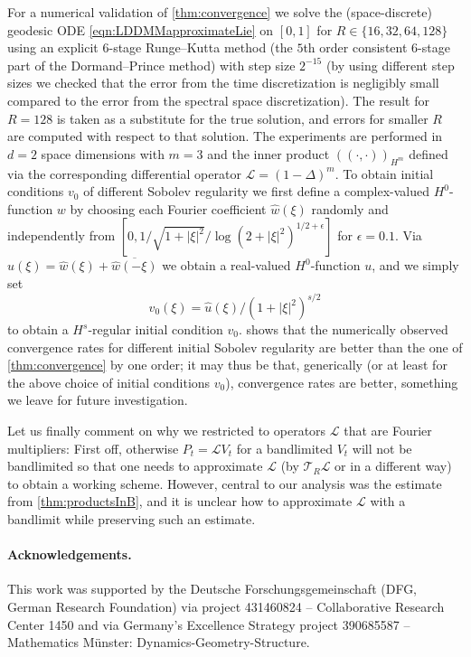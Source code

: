 \documentclass[a4paper, 12pt]{article}
\renewcommand{\L}{\mathcal{L}}
\newcommand{\trunc}[1][R]{\mathcal{T}_{#1}}
\newcommand{\IPHm}[2]{(\!(#1,#2)\!)_{H^m}} %
\begin{document}
For a numerical validation of \cref{thm:convergence} we solve the (space-discrete) geodesic ODE \eqref{eqn:LDDMMapproximateLie} on $[0,1]$ for $R\in\{16,32,64,128\}$
using an explicit $6$-stage Runge--Kutta method (the $5$th order consistent $6$-stage part of the Dormand--Prince method) with step size $2^{-15}$
(by using different step sizes we checked that the error from the time discretization is negligibly small compared to the error from the spectral space discretization).
The result for $R=128$ is taken as a substitute for the true solution, and errors for smaller $R$ are computed with respect to that solution.
The experiments are performed in $d=2$ space dimensions with $m=3$ and the inner product $\IPHm{\cdot}{\cdot}$ defined via the corresponding differential operator $\L=(1-\Delta)^m$.
To obtain initial conditions $v_0$ of different Sobolev regularity we first define a complex-valued $H^0$-function $w$
by choosing each Fourier coefficient $\hat w(\xi)$ randomly and independently from $[0,1/\sqrt{1+|\xi|^2}/\log(2+|\xi|^2)^{1/2+\epsilon}]$ for $\epsilon=0.1$.
Via $\hat u(\xi)=\hat w(\xi)+\overline{\hat w(-\xi)}$ we obtain a real-valued $H^0$-function $u$, and we simply set
\begin{equation*}
\hat v_0(\xi)=\hat u(\xi)/(1+|\xi|^2)^{s/2}
\end{equation*}
to obtain a $H^s$-regular initial condition $v_0$.
 shows that the numerically observed convergence rates for different initial Sobolev regularity are better than the one of \cref{thm:convergence} by one order;
it may thus be that, generically (or at least for the above choice of initial conditions $v_0$), convergence rates are better, something we leave for future investigation.

Let us finally comment on why we restricted to operators $\L$ that are Fourier multipliers:
First off, otherwise $P_t=\L V_t$ for a bandlimited $V_t$ will not be bandlimited so that one needs to approximate $\L$ (by $\trunc\L$ or in a different way) to obtain a working scheme.
However, central to our analysis was the estimate from \cref{thm:productsInB}, and it is unclear how to approximate $\L$ with a bandlimit while preserving such an estimate.


\paragraph{Acknowledgements.}
This work was supported by the Deutsche Forschungsgemeinschaft (DFG, German Research Foundation) via project 431460824 -- Collaborative Research Center 1450
and via Germany's Excellence Strategy project 390685587 -- Mathematics M\"unster: Dynamics-Geometry-Structure.




\end{document}
